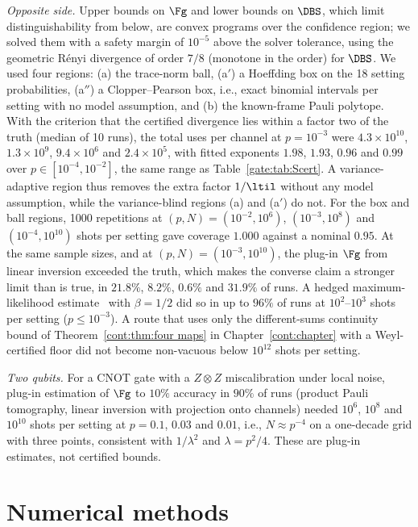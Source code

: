 \emph{Opposite side.} Upper bounds on $\Fg$ and lower bounds on $\DBS$, which limit distinguishability from below, are convex programs over the confidence region; we solved them with a safety margin of $10^{-5}$ above the solver tolerance, using the geometric R\'enyi divergence of order $7/8$ (monotone in the order) for $\DBS$. We used four regions: (a) the trace-norm ball, (a$'$) a Hoeffding box on the 18 setting probabilities, (a$''$) a Clopper--Pearson box, i.e., exact binomial intervals per setting with no model assumption, and (b) the known-frame Pauli polytope. With the criterion that the certified divergence lies within a factor two of the truth (median of 10 runs), the total uses per channel at $p=10^{-3}$ were $4.3\times10^{10}$, $1.3\times10^{9}$, $9.4\times10^{6}$ and $2.4\times10^{5}$, with fitted exponents $1.98$, $1.93$, $0.96$ and $0.99$ over $p\in[10^{-4},10^{-2}]$, the same range as Table~\ref{gate:tab:Scert}. A variance-adaptive region thus removes the extra factor $1/\ltil$ without any model assumption, while the variance-blind regions (a) and (a$'$) do not. For the box and ball regions, 1000 repetitions at $(p,N)=(10^{-2},10^6)$, $(10^{-3},10^8)$ and $(10^{-4},10^{10})$ shots per setting gave coverage $1.000$ against a nominal $0.95$. At the same sample sizes, and at $(p,N)=(10^{-3},10^{10})$, the plug-in $\Fg$ from linear inversion exceeded the truth, which makes the converse claim a stronger limit than is true, in $21.8\%$, $8.2\%$, $0.6\%$ and $31.9\%$ of runs. A hedged maximum-likelihood estimate~\cite{BlumeKohout2010} with $\beta=1/2$ did so in up to $96\%$ of runs at $10^2$--$10^3$ shots per setting ($p\le10^{-3}$). A route that uses only the different-sums continuity bound of Theorem~\ref{cont:thm:four maps} in Chapter~\ref{cont:chapter} with a Weyl-certified floor did not become non-vacuous below $10^{12}$ shots per setting.

\emph{Two qubits.} For a CNOT gate with a $Z\otimes Z$ miscalibration under local noise, plug-in estimation of $\Fg$ to $10\%$ accuracy in $90\%$ of runs (product Pauli tomography, linear inversion with projection onto channels) needed $10^6$, $10^8$ and $10^{10}$ shots per setting at $p=0.1$, $0.03$ and $0.01$, i.e., $N\approx p^{-4}$ on a one-decade grid with three points, consistent with $1/\lambda^2$ and $\lambda=p^2/4$. These are plug-in estimates, not certified bounds.

\section{Numerical methods}\label{gate:sec:methods}

